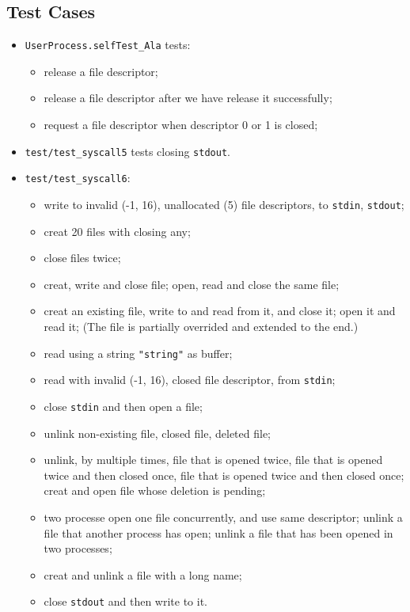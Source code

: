 \documentclass{article}
\begin{document}
\subsection{Test Cases}

\begin{itemize}
\item
\texttt{UserProcess.selfTest\_Ala} tests:
	\begin{itemize}
	\item
	release a file descriptor;
	\item
	release a file descriptor after we have release it successfully;
	\item
	request a file descriptor when descriptor 0 or 1 is closed;
	\end{itemize}

\item
\texttt{test/test\_syscall5} tests closing \texttt{stdout}.

\item
\texttt{test/test\_syscall6}:
	\begin{itemize}
	\item
	write to invalid (-1, 16), unallocated (5) file descriptors, to \texttt{stdin}, \texttt{stdout};
	\item
	creat 20 files with closing any;
	\item
	close files twice;
	\item
	creat, write and close file; open, read and close the same file;
	\item
	creat an existing file, write to and read from it, and close it;
	open it and read it; (The file is partially overrided and extended to the end.)
	\item
	read using a string \texttt{"string"} as buffer;
	\item
	read with invalid (-1, 16), closed file descriptor, from \texttt{stdin};
	\item
	close \texttt{stdin} and then open a file;
	\item
	unlink non-existing file, closed file, deleted file;
	\item
	unlink, by multiple times, file that is opened twice, file that is opened twice and then closed once, file that is opened twice and then closed once;
	creat and open file whose deletion is pending;
	\item
	two processe open one file concurrently, and use same descriptor;
	unlink a file that another process has open;
	unlink a file that has been opened in two processes;
	\item
	creat and unlink a file with a long name;
	\item
	close \texttt{stdout} and then write to it.
	\end{itemize}
\end{itemize}
\end{document}
